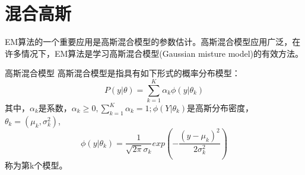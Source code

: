 \section{混合高斯}
EM算法的一个重要应用是高斯混合模型的参数估计。高斯混合模型应用广泛，在许多情况下，EM算法是学习高斯混合模型(Gaussian misture model)的有效方法。
\begin{definition}{高斯混合模型}{}
	高斯混合模型是指具有如下形式的概率分布模型：
	\begin{equation}
		P(y|\theta)=\sum_{k=1}^{K}\alpha_k\phi(y|\theta_k)
	\end{equation}
	其中，$\alpha_k$是系数，$\alpha_k\geqslant 0,\sum\limits_{k=1}^{K}\alpha_k=1;\phi(Y|\theta_k)$是高斯分布密度，$\theta_k=(\mu_k,\sigma_k^2)$,
	\begin{equation}
		\phi(y|\theta_k)=\frac{1}{\sqrt{2\pi}\sigma_k}exp\left(-\frac{(y-\mu_k)^2}{2\sigma_k^2}\right)
	\end{equation}
	称为第k个模型。
\end{definition}
